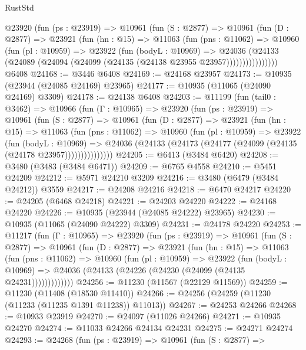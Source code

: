 \begin{lexlean}{RustStd}
\begin{coremodule}
{{{{{{{{{{{{{{{{{{{        @23920
          (fun (ps : @23919) =>
          @10961
            (fun (S : @2877) =>
            @10961
              (fun (D : @2877) =>
              @23921
                (fun (hn : @15) =>
                @11063
                  (fun (pns : @11062) =>
                  @10960
                    (fun (pl : @10959) =>
                    @23922
                      (fun (bodyL : @10969) =>
                      @24036
                        (@24133
                          (@24089 (@24094 (@24099 (@24135 (@24138 @23955 @23957))))))))))))))))
    @6408
@24168 := @3446 @6408
@24169 := @24168 @23957
@24173 := @10935 (@23944 (@24085 @24169) @23965)
@24177 := @10935 (@11065 (@24090 @24169) @3309)
@24178 := @24138 @6408
@24203 := @11199
    (fun (tail0 : @3462) =>
    @10966
      (fun (Γ : @10965) =>
      @23920
        (fun (ps : @23919) =>
        @10961
          (fun (S : @2877) =>
          @10961
            (fun (D : @2877) =>
            @23921
              (fun (hn : @15) =>
              @11063
                (fun (pns : @11062) =>
                @10960
                  (fun (pl : @10959) =>
                  @23922
                    (fun (bodyL : @10969) =>
                    @24036 (@24133 (@24173 (@24177 (@24099 (@24135 (@24178 @23957)))))))))))))))
@24205 := @6413 (@3484 @6420)
@24208 := @3480 (@3483 (@3484 @6471))
@24209 := @6765 @4558
@24210 := @5451 @24209
@24212 := @5971 @24210 @3209
@24216 := @3480 (@6479 (@3484 @24212)) @3559
@24217 := @24208 @24216
@24218 := @6470 @24217
@24220 := @24205 (@6468 @24218)
@24221 := @24203 @24220
@24222 := @24168 @24220
@24226 := @10935 (@23944 (@24085 @24222) @23965)
@24230 := @10935 (@11065 (@24090 @24222) @3309)
@24231 := @24178 @24220
@24253 := @11217
    (fun (Γ : @10965) =>
    @23920
      (fun (ps : @23919) =>
      @10961
        (fun (S : @2877) =>
        @10961
          (fun (D : @2877) =>
          @23921
            (fun (hn : @15) =>
            @11063
              (fun (pns : @11062) =>
              @10960
                (fun (pl : @10959) =>
                @23922
                  (fun (bodyL : @10969) =>
                  @24036 (@24133 (@24226 (@24230 (@24099 (@24135 @24231)))))))))))))
@24256 := @11230 (@11567 (@22129 @11569))
@24259 := @11230 (@11408 (@18530 @11410))
@24266 := @24256 (@24259 (@11230 (@11233 (@11235 @1391 @11238)) @11013))
@24267 := @24253 @24266
@24268 := @10933 @23919
@24270 := @24097 (@11026 @24266)
@24271 := @10935 @24270
@24274 := @11033 @24266 @24134 @24231
@24275 := @24271 @24274
@24293 := @24268
    (fun (ps : @23919) =>
    @10961
      (fun (S : @2877) =>
}}}}}}}}}}}}}}}}}}}
\end{coremodule}
\end{lexlean}
